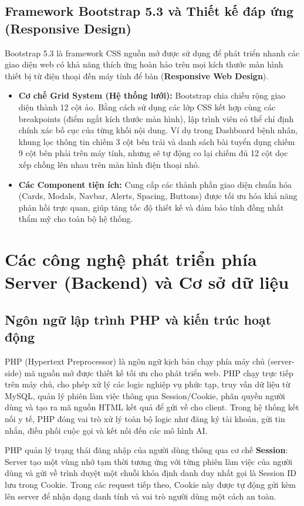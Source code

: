 \documentclass[a4paper,12pt]{report}
\begin{document}
\subsection{Framework Bootstrap 5.3 và Thiết kế đáp ứng (Responsive Design)}
Bootstrap 5.3 là framework CSS nguồn mở được sử dụng để phát triển nhanh các giao diện web có khả năng thích ứng hoàn hảo trên mọi kích thước màn hình thiết bị từ điện thoại đến máy tính để bàn (\textbf{Responsive Web Design}).
\begin{itemize}
    \item \textbf{Cơ chế Grid System (Hệ thống lưới):} Bootstrap chia chiều rộng giao diện thành 12 cột ảo. Bằng cách sử dụng các lớp CSS kết hợp cùng các breakpoints (điểm ngắt kích thước màn hình), lập trình viên có thể chỉ định chính xác bố cục của từng khối nội dung. Ví dụ trong Dashboard bệnh nhân, khung lọc thông tin chiếm 3 cột bên trái và danh sách bài tuyển dụng chiếm 9 cột bên phải trên máy tính, nhưng sẽ tự động co lại chiếm đủ 12 cột dọc xếp chồng lên nhau trên màn hình điện thoại nhỏ.
    \item \textbf{Các Component tiện ích:} Cung cấp các thành phần giao diện chuẩn hóa (Cards, Modals, Navbar, Alerts, Spacing, Buttons) được tối ưu hóa khả năng phản hồi trực quan, giúp tăng tốc độ thiết kế và đảm bảo tính đồng nhất thẩm mỹ cho toàn bộ hệ thống.
\end{itemize}

\section{Các công nghệ phát triển phía Server (Backend) và Cơ sở dữ liệu}

\subsection{Ngôn ngữ lập trình PHP và kiến trúc hoạt động}
PHP (Hypertext Preprocessor) là ngôn ngữ kịch bản chạy phía máy chủ (server-side) mã nguồn mở được thiết kế tối ưu cho phát triển web. PHP chạy trực tiếp trên máy chủ, cho phép xử lý các logic nghiệp vụ phức tạp, truy vấn dữ liệu từ MySQL, quản lý phiên làm việc thông qua Session/Cookie, phân quyền người dùng và tạo ra mã nguồn HTML kết quả để gửi về cho client. Trong hệ thống kết nối y tế, PHP đóng vai trò xử lý toàn bộ logic như đăng ký tài khoản, gửi tin nhắn, điều phối cuộc gọi và kết nối đến các mô hình AI.

PHP quản lý trạng thái đăng nhập của người dùng thông qua cơ chế \textbf{Session}: Server tạo một vùng nhớ tạm thời tương ứng với từng phiên làm việc của người dùng và gửi về trình duyệt một chuỗi khóa định danh duy nhất gọi là Session ID lưu trong Cookie. Trong các request tiếp theo, Cookie này được tự động gửi kèm lên server để nhận dạng danh tính và vai trò người dùng một cách an toàn.
\end{document}
